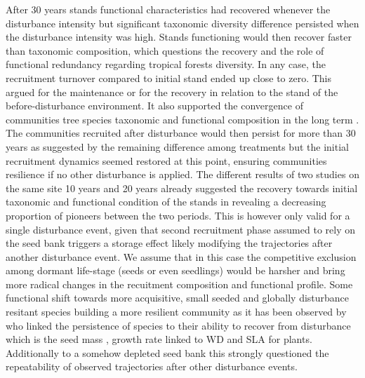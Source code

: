 \documentclass[fleqn,10pt]{ArtEcoFoG} %
\begin{document}
After 30 years stands functional characteristics had recovered whenever
the disturbance intensity but significant taxonomic diversity difference
persisted when the disturbance intensity was high. Stands functioning
would then recover faster than taxonomic composition, which questions
the recovery and the role of functional redundancy regarding tropical
forests diversity. In any case, the recruitment turnover compared to
initial stand ended up close to zero. This argued for the maintenance or
for the recovery in relation to the stand \citep{Anderson2007} of the
before-disturbance environment. It also supported the convergence of
communities tree species taxonomic and functional composition in the
long term \citep{Li2016}. The communities recruited after disturbance
would then persist for more than 30 years as suggested by the remaining
difference among treatments but the initial recruitment dynamics seemed
restored at this point, ensuring communities resilience if no other
disturbance is applied. The different results of two studies on the same
site 10 years \citep{Molino2001} and 20 years \citep{Baraloto2012a}
already suggested the recovery towards initial taxonomic and functional
condition of the stands in revealing a decreasing proportion of pioneers
between the two periods. This is however only valid for a single
disturbance event, given that second recruitment phase assumed to rely
on the seed bank triggers a storage effect likely modifying the
trajectories after another disturbance event. We assume that in this
case the competitive exclusion among dormant life-stage (seeds or even
seedlings) would be harsher and bring more radical changes in the
recuitment composition and functional profile. Some functional shift
towards more acquisitive, small seeded and globally disturbance resitant
species building a more resilient community as it has been observed by
\citep{Haddad2008} who linked the persistence of species to their
ability to recover from disturbance which is the seed mass , growth rate
linked to WD and SLA for plants. Additionally to a somehow depleted seed
bank this strongly questioned the repeatability of observed trajectories
after other disturbance events.
\end{document}
